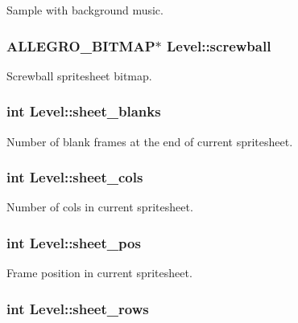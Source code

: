 \-Sample with background music. \hypertarget{structLevel_a40c90c0712efb86cd76d0dcae74f2cbd}{
\subsubsection[{screwball}]{\setlength{\rightskip}{0pt plus 5cm}\-A\-L\-L\-E\-G\-R\-O\-\_\-\-B\-I\-T\-M\-A\-P$\ast$ {\bf \-Level\-::screwball}}}\label{structLevel_a40c90c0712efb86cd76d0dcae74f2cbd}
\-Screwball spritesheet bitmap. \hypertarget{structLevel_aebaaba311e5d4842fdbd8c50edd40808}{
\subsubsection[{sheet\-\_\-blanks}]{\setlength{\rightskip}{0pt plus 5cm}int {\bf \-Level\-::sheet\-\_\-blanks}}}\label{structLevel_aebaaba311e5d4842fdbd8c50edd40808}
\-Number of blank frames at the end of current spritesheet. \hypertarget{structLevel_a8a5c443169a4ff15f330a65473eedb1b}{
\subsubsection[{sheet\-\_\-cols}]{\setlength{\rightskip}{0pt plus 5cm}int {\bf \-Level\-::sheet\-\_\-cols}}}\label{structLevel_a8a5c443169a4ff15f330a65473eedb1b}
\-Number of cols in current spritesheet. \hypertarget{structLevel_a21c699af201ffe60ccd1319b3f540947}{
\subsubsection[{sheet\-\_\-pos}]{\setlength{\rightskip}{0pt plus 5cm}int {\bf \-Level\-::sheet\-\_\-pos}}}\label{structLevel_a21c699af201ffe60ccd1319b3f540947}
\-Frame position in current spritesheet. \hypertarget{structLevel_a6d608b79c9b4dd8a5efc0c7e5fb482b0}{
\subsubsection[{sheet\-\_\-rows}]{\setlength{\rightskip}{0pt plus 5cm}int {\bf \-Level\-::sheet\-\_\-rows}}}\label{structLevel_a6d608b79c9b4dd8a5efc0c7e5fb482b0}
